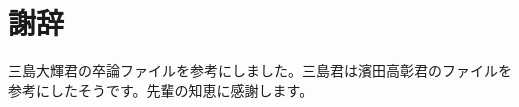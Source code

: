 \documentclass[main.tex]{subfiles}
\begin{document}
\section*{謝辞}
三島大輝君の卒論ファイルを参考にしました。三島君は濱田高彰君のファイルを参考にしたそうです。先輩の知恵に感謝します。
\end{document}
